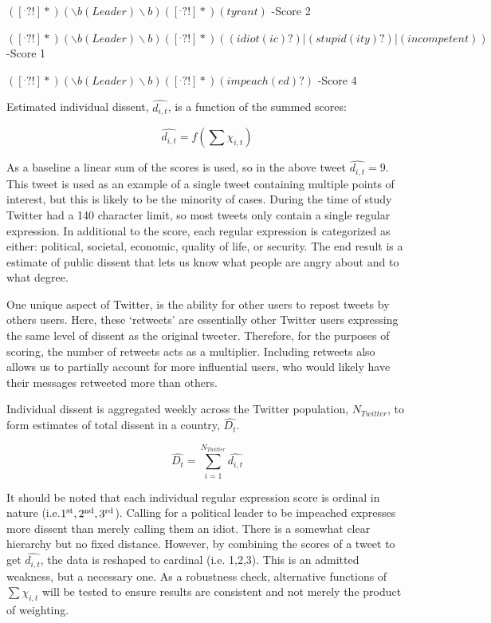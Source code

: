 \documentclass[12pt]{article}
\begin{document}
\begin{spacing}{1.5}
\begin{center}
$([^.?!]*)(\backslash b(Leader)\backslash b)([^.?!]*)(tyrant)$ -Score 2

\vspace{.5 em}
$([^.?!]*) (\backslash b(Leader)\backslash b)([^.?!]*)((idiot(ic)?)|(stupid(ity)?)|(incompetent))$ -Score 1

\vspace{.5 em}
$([^.?!]*)(\backslash b(Leader)\backslash b)([^.?!]*)(impeach(ed)?)$ -Score 4
\end{center}

\noindent Estimated individual dissent, $\hat{d_{i,t}}$, is a function of the summed scores:

\vspace{.5 em}
\begin{equation}
\hat{d_{i,t}}= f(\sum \chi_{i,t})
\end{equation}

As a baseline a linear sum of the scores is used, so in the above tweet $\hat{d_{i,t}}=9$. This tweet is used as an example of a single tweet containing multiple points of interest, but this is likely to be the minority of cases. During the time of study Twitter had a 140 character limit, so most tweets only contain a single regular expression. In additional to the score, each regular expression is categorized as either: political, societal, economic, quality of life, or security. The end result is a estimate of public dissent that lets us know what people are angry about and to what degree. 

One unique aspect of Twitter, is the ability for other users to repost tweets by others users. Here, these `retweets' are essentially other Twitter users expressing the same level of dissent as the original tweeter. Therefore, for the purposes of scoring, the number of retweets acts as a multiplier. Including retweets also allows us to partially account for more influential users, who would likely have their messages retweeted more than others.     

Individual dissent is aggregated weekly across the Twitter population, $N_{Twitter}$, to form estimates of total dissent in a country, $\hat{D_t}$. 

\vspace{.5 em}
\begin{equation}
\hat{D_t}= \sum_{i=1}^{N_{Twitter}} \hat{d_{i,t}} 	
\end{equation}

It should be noted that each individual regular expression score is ordinal in nature (i.e.$1\textsuperscript{st}, 2\textsuperscript{nd}, 3\textsuperscript{rd}$). Calling for a political leader to be impeached expresses more dissent than merely calling them an idiot. There is a somewhat clear hierarchy but no fixed distance. However, by combining the scores of a tweet to get $\hat{d_{i,t}}$, the data is reshaped to cardinal (i.e. 1,2,3). This is an admitted weakness, but a necessary one. As a robustness check, alternative functions of $\sum \chi_{i,t}$ will be tested to ensure results are consistent and not merely the product of weighting. 



\end{spacing}
\end{document}
